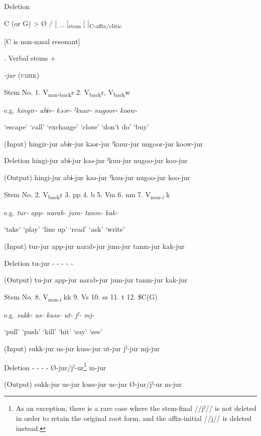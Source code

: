 \ea\label{ex:8-14}
  Deletion

  C (or G)  >  Ø  /  [   \_ ]\textsubscript{stem}  [   ]\textsubscript{C-affix/clitic}

  [C is non-nasal resonant]
\z

\begin{table}
\caption{\label{tab:key:62}. Verbal stems +} \textmd{\textit{-jur}}\textmd{ (\textsc{umrk})}

Stem No.  1. V\textsubscript{non-back}r  2. V\textsubscript{back}r, V\textsubscript{back}w

e.g.  \textit{hingir-}  \textit{abɨr-}  \textit{kəər-}  \textit{ˀkuur-}  \textit{nugoor-}  \textit{koow-}

  ‘escape’  ‘call’  ‘exchange’  ‘close’  ‘don’t do’  ‘buy’

(Input)  hingir-jur  abɨr-jur  kəər-jur  ˀkuur-jur  nugoor-jur  koow-jur

Deletion  hingi-jur  abɨ-jur  kəə-jur  ˀkuu-jur  nugoo-jur  koo-jur

(Output)  hingi-jur  abɨ-jur  kəə-jur  ˀkuu-jur  nugoo-jur  koo-jur

Stem No.  2. V\textsubscript{back}r  3. pp  4. b  5. Vm  6. nm  7. V\textsubscript{non-}\textit{\textsubscript{i} }k

e.g.  \textit{tur-}  \textit{app-}  \textit{narab-}  \textit{jum-}  \textit{tanm-}  \textit{kak-}

  ‘take’  ‘play’  ‘line up’  ‘read’  ‘ask’  ‘write’

(Input)  tur-jur  app-jur  narab-jur  jum-jur  tanm-jur  kak-jur

Deletion  tu-jur  -  -  -  -  -

(Output)  tu-jur  app-jur  narab-jur  jum-jur  tanm-jur  kak-jur

Stem No.  8. V\textsubscript{non-}\textit{\textsubscript{i} }kk  9. Vs  10. ss  11. t  12. \$C(G)

e.g.  \textit{sukk-}  \textit{us-}  \textit{kuss-}  \textit{ut-}  \textit{jˀ-}  \textit{mj-}

  ‘pull’  ‘push’  ‘kill’  ‘hit’  ‘say’  ‘see’

(Input)  sukk-jur  us-jur  kuss-jur  ut-jur  jˀ-jur  mj-jur

Deletion  -  -  -  -  Ø-jur/jˀ-ur\footnote{As an exception, there is a rare case where the stem-final //jˀ// is not deleted in order to retain the original root form, and the affix-initial //j// is deleted instead.}  m-jur

(Output)  sukk-jur  us-jur  kuss-jur  uc-jur  Ø-jur/jˀ-ur  m-jur


\end{table}

